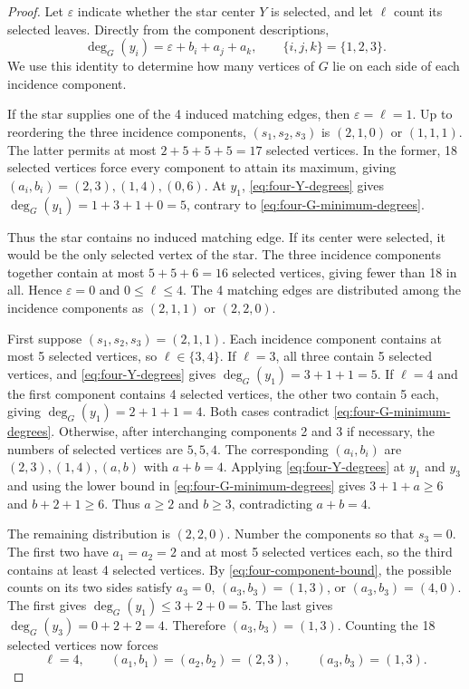 \documentclass[10pt]{article}
\numberwithin{equation}{section}
\theoremstyle{definition}
\begin{document}
\begin{proof}
Let $\varepsilon$ indicate whether the star center $Y$ is selected, and let $\ell$ count its selected leaves. Directly from the component descriptions,
\begin{equation}
 \deg_G(y_i)=\varepsilon+b_i+a_j+a_k,
 \qquad \{i,j,k\}=\{1,2,3\}.
 \label{eq:four-Y-degrees}
\end{equation}
We use this identity to determine how many vertices of $G$ lie on each side of each incidence component.

If the star supplies one of the 4 induced matching edges, then $\varepsilon=\ell=1$. Up to reordering the three incidence components, $(s_1,s_2,s_3)$ is $(2,1,0)$ or $(1,1,1)$. The latter permits at most $2+5+5+5=17$ selected vertices. In the former, 18 selected vertices force every component to attain its maximum, giving $(a_i,b_i)=(2,3),(1,4),(0,6)$. At $y_1$, \cref{eq:four-Y-degrees} gives $\deg_G(y_1)=1+3+1+0=5$, contrary to \cref{eq:four-G-minimum-degrees}.

Thus the star contains no induced matching edge. If its center were selected, it would be the only selected vertex of the star. The three incidence components together contain at most $5+5+6=16$ selected vertices, giving fewer than 18 in all. Hence $\varepsilon=0$ and $0\le\ell\le4$. The 4 matching edges are distributed among the incidence components as $(2,1,1)$ or $(2,2,0)$.

First suppose $(s_1,s_2,s_3)=(2,1,1)$. Each incidence component contains at most 5 selected vertices, so $\ell\in\{3,4\}$. If $\ell=3$, all three contain 5 selected vertices, and \cref{eq:four-Y-degrees} gives $\deg_G(y_1)=3+1+1=5$. If $\ell=4$ and the first component contains 4 selected vertices, the other two contain 5 each, giving $\deg_G(y_1)=2+1+1=4$. Both cases contradict \cref{eq:four-G-minimum-degrees}. Otherwise, after interchanging components 2 and 3 if necessary, the numbers of selected vertices are $5,5,4$. The corresponding $(a_i,b_i)$ are $(2,3),(1,4),(a,b)$ with $a+b=4$. Applying \cref{eq:four-Y-degrees} at $y_1$ and $y_3$ and using the lower bound in \cref{eq:four-G-minimum-degrees} gives $3+1+a\ge6$ and $b+2+1\ge6$. Thus $a\ge2$ and $b\ge3$, contradicting $a+b=4$.

The remaining distribution is $(2,2,0)$. Number the components so that $s_3=0$. The first two have $a_1=a_2=2$ and at most 5 selected vertices each, so the third contains at least 4 selected vertices. By \cref{eq:four-component-bound}, the possible counts on its two sides satisfy $a_3=0$, $(a_3,b_3)=(1,3)$, or $(a_3,b_3)=(4,0)$. The first gives $\deg_G(y_1)\le3+2+0=5$. The last gives $\deg_G(y_3)=0+2+2=4$. Therefore $(a_3,b_3)=(1,3)$. Counting the 18 selected vertices now forces
\begin{equation}
 \ell=4,\qquad
 (a_1,b_1)=(a_2,b_2)=(2,3),\qquad
 (a_3,b_3)=(1,3).
 \label{eq:four-forced-profile}
\end{equation}


\end{proof}
\end{document}
